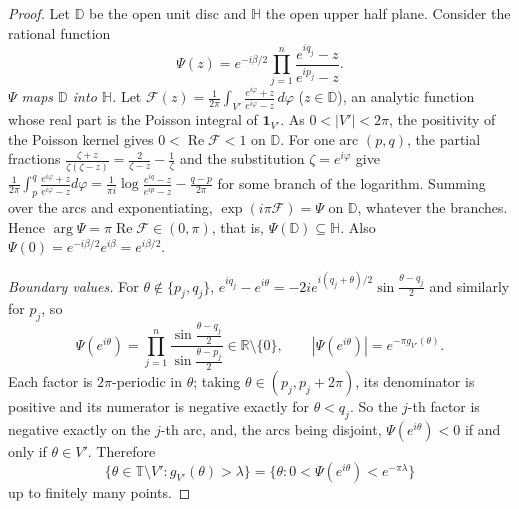\documentclass[11pt]{amsart}
\theoremstyle{definition}
\theoremstyle{remark}
\newcommand{\R}{\mathbb{R}}
\newcommand{\T}{\mathbb{T}}
\newcommand{\D}{\mathbb{D}}
\newcommand{\HH}{\mathbb{H}}
\renewcommand{\Re}{\operatorname{Re}}
\newcommand{\one}{\mathbf{1}}
\begin{document}
\begin{proof}
Let $\D$ be the open unit disc and $\HH$ the open upper half plane. Consider the rational function
\[
\Psi(z)=e^{-i\beta/2}\prod_{j=1}^n\frac{e^{iq_j}-z}{e^{ip_j}-z}.
\]
\emph{$\Psi$ maps $\D$ into $\HH$.} Let $\mathcal F(z)=\frac1{2\pi}\int_{V'}\frac{e^{i\varphi}+z}{e^{i\varphi}-z}\,d\varphi$
($z\in\D$), an analytic function whose real part is the Poisson integral of $\one_{V'}$. As $0<|V'|<2\pi$, the
positivity of the Poisson kernel gives $0<\Re\mathcal F<1$ on $\D$. For one arc $(p,q)$, the partial fractions
$\frac{\zeta+z}{\zeta(\zeta-z)}=\frac2{\zeta-z}-\frac1\zeta$ and the substitution $\zeta=e^{i\varphi}$ give
$\frac1{2\pi}\int_{p}^{q}\frac{e^{i\varphi}+z}{e^{i\varphi}-z}d\varphi
=\frac1{\pi i}\log\frac{e^{iq}-z}{e^{ip}-z}-\frac{q-p}{2\pi}$ for some branch of the logarithm.
Summing over the arcs and exponentiating, $\exp(i\pi\mathcal F)=\Psi$ on $\D$, whatever the branches. Hence
$\arg\Psi=\pi\Re\mathcal F\in(0,\pi)$, that is, $\Psi(\D)\subseteq\HH$. Also $\Psi(0)=e^{-i\beta/2}e^{i\beta}=e^{i\beta/2}$.

\emph{Boundary values.} For $\theta\notin\{p_j,q_j\}$,
$e^{iq_j}-e^{i\theta}=-2ie^{i(q_j+\theta)/2}\sin\frac{\theta-q_j}2$ and similarly for $p_j$, so
\[
\Psi(e^{i\theta})=\prod_{j=1}^n\frac{\sin\frac{\theta-q_j}2}{\sin\frac{\theta-p_j}2}\in\R\setminus\{0\},\qquad
|\Psi(e^{i\theta})|=e^{-\pi g_{V'}(\theta)} .
\]
Each factor is $2\pi$-periodic in $\theta$; taking $\theta\in(p_j,p_j+2\pi)$, its denominator is positive and its
numerator is negative exactly for $\theta<q_j$. So the $j$-th factor is negative exactly on the $j$-th arc,
and, the arcs being disjoint, $\Psi(e^{i\theta})<0$ if and only if $\theta\in V'$. Therefore
\[
\{\theta\in\T\setminus V':g_{V'}(\theta)>\lambda\}=\{\theta:0<\Psi(e^{i\theta})<e^{-\pi\lambda}\}
\]
up to finitely many points.


\end{proof}
\end{document}
